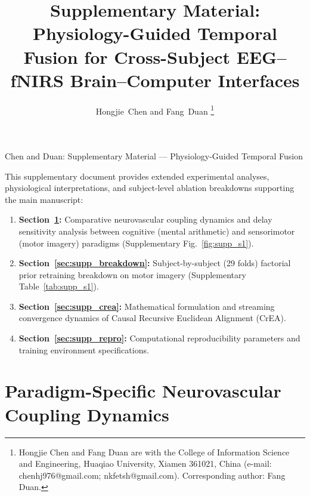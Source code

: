 \documentclass[journal]{IEEEtran}
\begin{document}
\title{Supplementary Material: Physiology-Guided Temporal Fusion for Cross-Subject EEG--fNIRS Brain--Computer Interfaces}

\author{Hongjie~Chen and Fang~Duan%
\thanks{Hongjie Chen and Fang Duan are with the College of Information Science and Engineering, Huaqiao University, Xiamen 361021, China (e-mail: chenhj976@gmail.com; nkfetsh@gmail.com). Corresponding author: Fang Duan.}%
}

%
{Chen and Duan: Supplementary Material --- Physiology-Guided Temporal Fusion}

\maketitle

This supplementary document provides extended experimental analyses, physiological interpretations, and subject-level ablation breakdowns supporting the main manuscript:
\begin{enumerate}
    \item \textbf{Section~\ref{sec:supp_dynamics}:} Comparative neurovascular coupling dynamics and delay sensitivity analysis between cognitive (mental arithmetic) and sensorimotor (motor imagery) paradigms (Supplementary Fig.~\ref{fig:supp_s1}).
    \item \textbf{Section~\ref{sec:supp_breakdown}:} Subject-by-subject (29 folds) factorial prior retraining breakdown on motor imagery (Supplementary Table~\ref{tab:supp_s1}).
    \item \textbf{Section~\ref{sec:supp_crea}:} Mathematical formulation and streaming convergence dynamics of Causal Recursive Euclidean Alignment (CrEA).
    \item \textbf{Section~\ref{sec:supp_repro}:} Computational reproducibility parameters and training environment specifications.
\end{enumerate}

\section{Paradigm-Specific Neurovascular Coupling Dynamics}
\label{sec:supp_dynamics}
\end{document}
